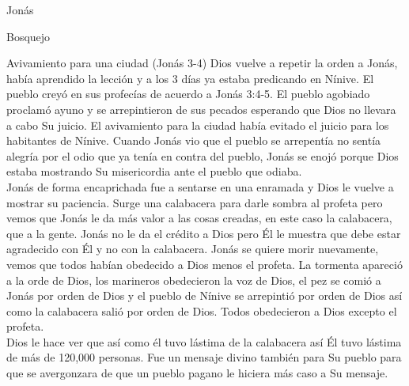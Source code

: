 \begin{section}{Jonás}
\begin{subsection}{Bosquejo}
\begin{subsubsection}{Avivamiento para una ciudad (Jonás 3-4)}
			Dios vuelve a repetir la orden a Jonás, había aprendido la lección y a los 3 días ya estaba predicando en Nínive. El pueblo creyó en sus profecías de acuerdo a Jonás 3:4-5. El pueblo agobiado proclamó ayuno y se arrepintieron de sus pecados esperando que Dios no llevara a cabo Su juicio. El avivamiento para la ciudad había evitado el juicio para los habitantes de Nínive. Cuando Jonás vio que el pueblo se arrepentía no sentía alegría por el odio que ya tenía en contra del pueblo, Jonás se enojó porque Dios estaba mostrando Su misericordia ante el pueblo que odiaba.\\
			Jonás de forma encaprichada fue a sentarse en una enramada y Dios le vuelve a mostrar su paciencia. Surge una calabacera para darle sombra al profeta pero vemos que Jonás le da más valor a las cosas creadas, en este caso la calabacera, que a la gente. Jonás no le da el crédito a Dios pero Él le muestra que debe estar agradecido con Él y no con la calabacera. Jonás se quiere morir nuevamente, vemos que todos habían obedecido a Dios menos el profeta. La tormenta apareció a la orde de Dios, los marineros obedecieron la voz de Dios, el pez se comió a Jonás por orden de Dios y el pueblo de Nínive se arrepintió por orden de Dios así como la calabacera salió por orden de Dios. Todos obedecieron a Dios excepto el profeta.\\
			Dios le hace ver que así como él tuvo lástima de la calabacera así Él tuvo lástima de más de 120,000 personas. Fue un mensaje divino también para Su pueblo para que se avergonzara de que un pueblo pagano le hiciera más caso a Su mensaje.
		\end{subsubsection}
	\end{subsection}
\end{section}
%


